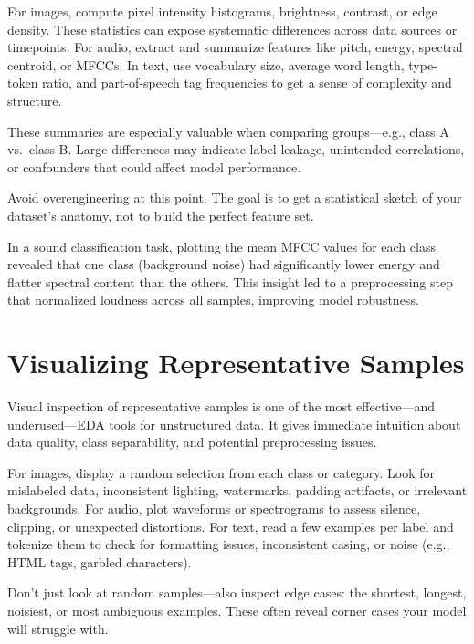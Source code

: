 \documentclass[12pt,openany, draft]{book}
\begin{document}
For images, compute pixel intensity histograms, brightness, contrast, or edge density. These statistics can expose systematic differences across data sources or timepoints. For audio, extract and summarize features like pitch, energy, spectral centroid, or MFCCs. In text, use vocabulary size, average word length, type-token ratio, and part-of-speech tag frequencies to get a sense of complexity and structure.
\newline

These summaries are especially valuable when comparing groups—e.g., class A vs.\ class B. Large differences may indicate label leakage, unintended correlations, or confounders that could affect model performance.
\newline

Avoid overengineering at this point. The goal is to get a statistical sketch of your dataset’s anatomy, not to build the perfect feature set.

\begin{examplebox}
In a sound classification task, plotting the mean MFCC values for each class revealed that one class (background noise) had significantly lower energy and flatter spectral content than the others. This insight led to a preprocessing step that normalized loudness across all samples, improving model robustness.
\end{examplebox}



\section{Visualizing Representative Samples}

Visual inspection of representative samples is one of the most effective—and underused—EDA tools for unstructured data. It gives immediate intuition about data quality, class separability, and potential preprocessing issues.
\newline

For images, display a random selection from each class or category. Look for mislabeled data, inconsistent lighting, watermarks, padding artifacts, or irrelevant backgrounds. For audio, plot waveforms or spectrograms to assess silence, clipping, or unexpected distortions. For text, read a few examples per label and tokenize them to check for formatting issues, inconsistent casing, or noise (e.g., HTML tags, garbled characters).
\newline

Don’t just look at random samples—also inspect edge cases: the shortest, longest, noisiest, or most ambiguous examples. These often reveal corner cases your model will struggle with.
\newline
\end{document}
